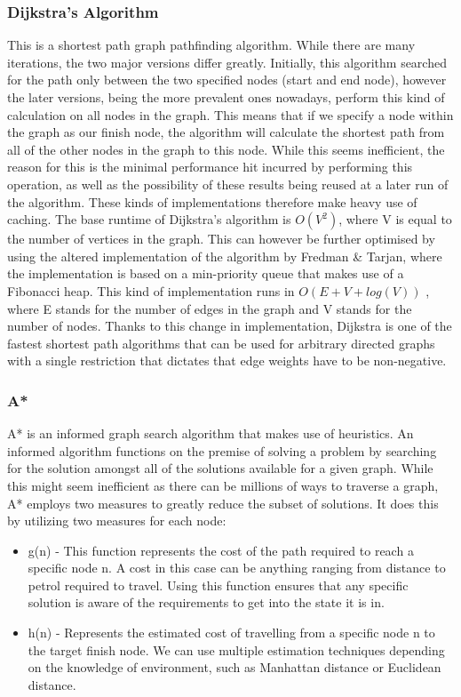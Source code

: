 \documentclass[12pt,a4paper]{report}
\begin{document}
\subsubsection{Dijkstra's Algorithm}
This is a shortest path graph pathfinding algorithm. While there are many iterations, the two major versions differ greatly. Initially, this algorithm searched for the path only between the two specified nodes (start and end node), however the later versions, being the more prevalent ones nowadays, perform this kind of calculation on all nodes in the graph. This means that if we specify a node within the graph as our finish node, the algorithm will calculate the shortest path from all of the other nodes in the graph to this node. While this seems inefficient, the reason for this is the minimal performance hit incurred by performing this operation, as well as the possibility of these results being reused at a later run of the algorithm. These kinds of implementations therefore make heavy use of caching. The base runtime of Dijkstra's algorithm is $O(V^2)$, where V is equal to the number of vertices in the graph. This can however be further optimised by using the altered implementation of the algorithm by Fredman \& Tarjan\cite{algoImprovedDijkstra}, where the implementation is based on a min-priority queue that makes use of a Fibonacci heap. This kind of implementation runs in $O( E + V + log(V) )$ , where E stands for the number of edges in the graph and V stands for the number of nodes. Thanks to this change in implementation, Dijkstra is one of the fastest shortest path algorithms that can be used for arbitrary directed graphs with a single restriction that dictates that edge weights have to be non-negative.


\subsubsection{A*}
A* is an informed graph search algorithm that makes use of heuristics.  An informed algorithm functions on the premise of solving a problem by searching for the solution amongst all of the solutions available for a given graph. While this might seem inefficient as there can be millions of ways to traverse a graph, A* employs two measures to greatly reduce the subset of solutions. It does this by utilizing two measures for each node:
\begin{itemize}
\item g(n) - This function represents the cost of the path required to reach a specific node n. A cost in this case can be anything ranging from distance to petrol required to travel. Using this function ensures that any specific solution is aware of the requirements to get into the state it is in.
\item h(n) - Represents the estimated cost of travelling from a specific node n to the target finish node. We can use multiple estimation techniques depending on the knowledge of environment, such as Manhattan distance or Euclidean distance.
\end{itemize}
\end{document}
